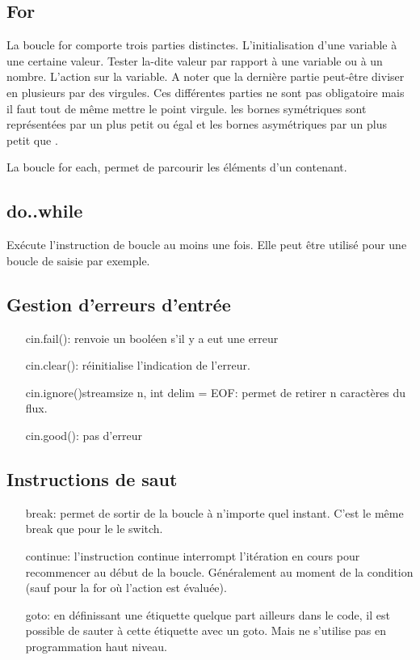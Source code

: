 \documentclass{article}
\begin{document}
\subsection{For}
La boucle for comporte trois parties distinctes. L'initialisation d'une variable à une certaine valeur. Tester la-dite valeur par rapport à une variable ou à un nombre. L'action sur la variable. A noter que la dernière partie peut-être diviser en plusieurs par des virgules. Ces différentes parties ne sont pas obligatoire mais il faut tout de même mettre le point virgule. les bornes symétriques sont représentées par un \og plus petit ou égal \fg et les bornes asymétriques par un \og plus petit que \fg. 

La boucle for each, permet de parcourir les éléments d'un contenant. 
\subsection{do..while}
Exécute l'instruction de boucle au moins une fois. Elle peut être utilisé pour une boucle de saisie par exemple. 

\subsection{Gestion d'erreurs d'entrée}
\bigskip
\begin{itemize}
    \item [cin.fail():] renvoie un booléen s'il y a eut une erreur
    \item [cin.clear():] réinitialise l'indication de l'erreur.
    \item [cin.ignore()streamsize n, int delim = EOF:] permet de retirer n caractères du flux. 
    \item [cin.good():] pas d'erreur
\end{itemize}
\bigskip

\subsection{Instructions de saut}
\begin{itemize}
    \item [break:] permet de sortir de la boucle à n'importe quel instant. C'est le même break que pour le le switch.
    \item [continue:] l'instruction continue interrompt l'itération en cours pour recommencer au début de la boucle. Généralement au moment de la condition (sauf pour la for où l'action est évaluée).
    \item [goto:] en définissant une étiquette quelque part ailleurs dans le code, il est possible de sauter à cette étiquette avec un goto. Mais ne s'utilise pas en programmation haut niveau. 
\end{itemize}
\bigskip
\end{document}
